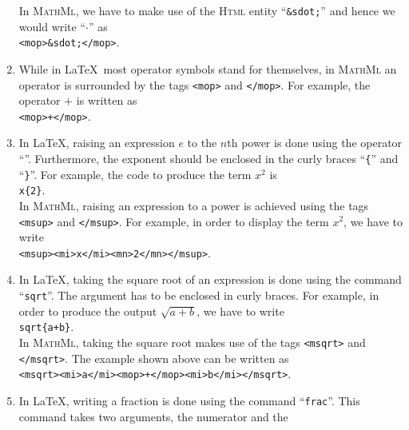 \begin{enumerate}
      In \textsc{MathMl}, we have to make use of the \textsc{Html} entity ``\texttt{\&sdot;}'' and
      hence we would write ``$\cdot$'' as
      \\[0.2cm]
      \hspace*{1.3cm}
      \texttt{<mop>\&sdot;</mop>}.
\item While in \LaTeX\ most operator symbols stand for themselves, in \textsc{MathMl}
      an operator is surrounded by the tags 
      \texttt{<mop>} and \texttt{</mop>}.  For example, the operator $+$ is written as    
      \\[0.2cm]
      \hspace*{1.3cm}
      \texttt{<mop>+</mop>}.
\item In \LaTeX, raising an expression $e$ to the $n$th power is done using the operator
      ``\texttt{}''.  Furthermore, the exponent should be enclosed in the curly braces
      ``\texttt{\{}'' and ``\texttt{\}}''.  For example, the code to produce the term $x^2$ is
      \\[0.2cm]
      \hspace*{1.3cm}
      \texttt{x\{2\}}.
      \\[0.2cm]
      In \textsc{MathMl}, raising an expression to a power is achieved using the tags
      \texttt{<msup>} and \texttt{</msup>}.  For example, in order to display the term $x^2$, we
      have to write  
      \\[0.2cm]
      \hspace*{1.3cm}
      \texttt{<msup><mi>x</mi><mn>2</mn></msup>}.
\item In \LaTeX, taking the square root of an expression is done using the command
      ``\texttt{sqrt}''.  The argument has to be enclosed in curly braces.
      For example, in order to produce the output $\sqrt{a+b}$, we have to write
      \\[0.2cm]
      \hspace*{1.3cm}
      \texttt{sqrt\{a+b\}}.
      \\[0.2cm]
      In \textsc{MathMl}, taking the square root makes use of the tags \texttt{<msqrt>} 
      and \texttt{</msqrt>}.  The example shown above can be written as
      \\[0.2cm]
      \hspace*{1.3cm}
      \texttt{<msqrt><mi>a</mi><mop>+</mop><mi>b</mi></msqrt>}.
\item In \LaTeX, writing a fraction is done using the command
      ``\texttt{frac}''.  This command takes two arguments, the numerator and the

\end{enumerate}
